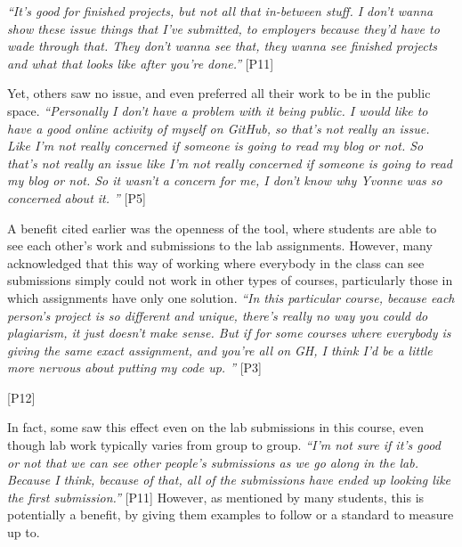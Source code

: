 \textit{``It's good for finished projects, but not all that in-between stuff. I don't wanna show these issue things that I've submitted, to employers because they'd have to wade through that. They don't wanna see that, they wanna see finished projects and what that looks like after you're done.''} [P11]


Yet, others saw no issue, and even preferred all their work to be in the public space. \textit{``Personally I don't have a problem with it being public. I would like to have a good online activity of myself on GitHub, so that's not really an issue. Like I'm not really concerned if someone is going to read my blog or not. So that's not really an issue like I'm not really concerned if someone is going to read my blog or not. So it wasn't a concern for me, I don't know why Yvonne was so concerned about it. ''} [P5]

A benefit cited earlier was the openness of the tool, where students are able to see each other's work and submissions to the lab assignments. However, many acknowledged that this way of working where everybody in the class can see submissions simply could not work in other types of courses, particularly those in which assignments have only one solution. \textit{``In this particular course, because each person's project is so different and unique, there's really no way you could do plagiarism, it just doesn't make sense. But if for some courses where everybody is giving the same exact assignment, and you're all on GH, I think I'd be a little more nervous about putting my code up. ''} [P3]

 [P12]

In fact, some saw this effect even on the lab submissions in this course, even though lab work typically varies from group to group. \textit{``I'm not sure if it's good or not that we can see other people's submissions as we go along in the lab. Because I think, because of that, all of the submissions have ended up looking like the first submission.''} [P11] However, as mentioned by many students, this is potentially a benefit, by giving them examples to follow or a standard to measure up to.

